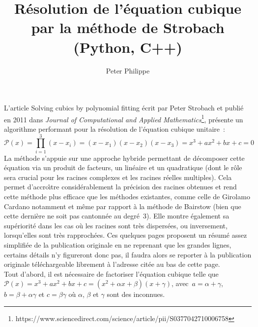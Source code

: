 \documentclass[11pt]{amsart}
\title{R\'esolution de l'\'equation cubique par la m\'ethode de Strobach (Python, C++)}
\author{Peter Philippe}
\newcommand{\ds}{\displaystyle}
\begin{document}
\maketitle

L'article \og Solving cubics by polynomial fitting \fg{} \'ecrit par Peter Strobach et publi\'e en 2011 dans \textit{Journal of Computational and Applied Mathematics}\footnote{https://www.sciencedirect.com/science/article/pii/S0377042710006758},
pr\'esente un algorithme performant pour la r\'esolution de l'\'equation cubique unitaire~:
$$\ds \mathcal{P}(x) = \prod_{i=1}^{3} (x-x_{i}) = (x-x_{1})(x-x_{2})(x-x_{3})= x^3 + ax^2 + bx + c = 0$$
La m\'ethode s'appuie sur une approche hybride permettant de d\'ecomposer cette \'equation via un produit de facteurs, un lin\'eaire et un quadratique (dont le
r\^ole sera crucial pour les racines complexes et les racines r\'eelles multiples). Cela permet d'accro\^{\i}tre consid\'erablement la pr\'ecision des racines
obtenues et rend cette m\'ethode plus efficace que les m\'ethodes existantes, comme celle de Girolamo Cardano notamment et m\^eme par rapport \`a la m\'ethode
de Bairstow (bien que cette derni\`ere ne soit pas cantonn\'ee au degr\'e~3). Elle montre \'egalement sa sup\'eriorit\'e dans les cas o\`u les racines sont tr\`es
dispers\'ees, ou inversement, lorsqu'elles sont tr\`es rapproch\'ees. Ces quelques pages proposent un r\'esum\'e assez simplifi\'ee de la publication originale
en ne reprenant que les grandes lignes, certains d\'etails n'y figureront donc pas, il faudra alors se reporter \`a la publication originale t\'el\'echargeable librement
\`a l'adresse cit\'ee au bas de cette page.\\

Tout d'abord, il est n\'ecessaire de factoriser l'\'equation cubique telle que~$\mathcal{P}(x) = x^3 + ax^2 + bx + c = (x^2 + \alpha{}x + \beta)(x+\gamma)$,
avec~$a = \alpha+\gamma$, $b = \beta + \alpha\gamma$ et $c = \beta \gamma$ o\`u $\alpha$, $\beta$ et $\gamma$ sont des inconnues.\\
\end{document}

